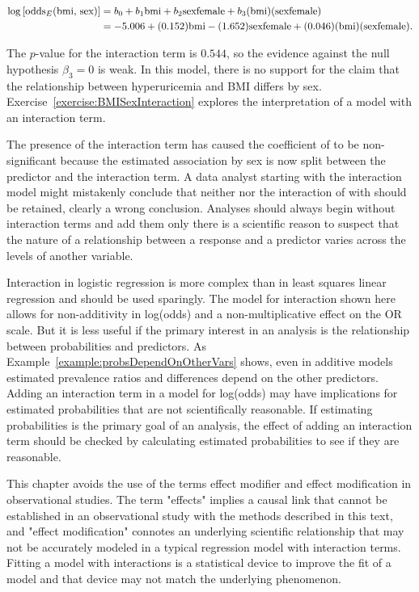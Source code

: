 \begin{align}
  \log\left[\text{odds}_E(\text{bmi, sex})\right] &= b_0 + b_1\text{bmi}
  + b_2\text{sexfemale} + b_3\text{(bmi)(sexfemale)} \notag \\
  &= -5.006 + (0.152)\text{bmi}
  -(1.652)\text{sexfemale} + (0.046)\text{(bmi)(sexfemale)}.
  \label{eqn:huBmiSexInteractionLogReg}
\end{align}

The $p$-value for the interaction term is $0.544$, so the evidence against the null hypothesis $\beta_3 = 0$ is weak.  In this model, there is no support for the claim that the relationship between hyperuricemia and BMI differs by sex.  Exercise~\ref{exercise:BMISexInteraction} explores the interpretation of a model with an interaction term.

The presence of the interaction term has caused the coefficient of  to be non-significant because the estimated association by sex is now split between the predictor  and the interaction term.  A data analyst starting with the interaction model might mistakenly conclude that neither  nor the interaction of  with  should be retained, clearly a wrong conclusion.  Analyses should always begin without interaction terms and add them only there is a scientific reason to suspect that the nature of a relationship between a response and a predictor varies across the levels of another variable.

Interaction in logistic regression is more complex than in least squares linear regression and should be used sparingly. The model for interaction shown here allows for non-additivity in log(odds) and  a non-multiplicative effect on the OR scale. But it is less useful if the primary interest in an analysis is the relationship between probabilities and predictors.  As Example~\ref{example:probsDependOnOtherVars} shows, even in additive models estimated prevalence ratios and differences depend on the other predictors.  Adding an interaction term in a model for log(odds) may have implications for estimated probabilities that are not scientifically reasonable.  If estimating probabilities is the primary goal of an analysis, the effect of adding an interaction term should be checked by calculating estimated probabilities to see if they are reasonable.



This chapter avoids the use of the terms effect modifier and effect modification in observational studies. The term "effects" implies a causal link that cannot be established in an observational study with the methods described in this text, and "effect modification" connotes an underlying scientific relationship that may not be accurately modeled in a typical regression model with interaction terms.  Fitting a model with interactions is a statistical device to improve the fit of a model and that device may not match the underlying phenomenon.

